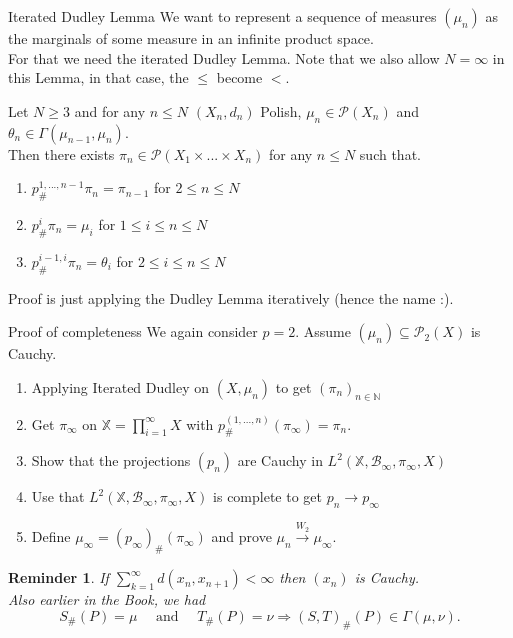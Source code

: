 \documentclass[10pt]{beamer}
\theoremstyle{reminder}
\newtheorem{reminder}{Reminder}
\begin{document}
\begin{frame}{Iterated Dudley Lemma}
    We want to represent a sequence of measures $(\mu_n)$ as the marginals of some measure in an infinite product space. \\ 
    \vspace{0.5cm}
    For that we need the iterated Dudley Lemma. Note that we also allow $N = \infty$ in this Lemma, in that case, the $\leq$ become $<$.
    \begin{lemma}
        Let $N \geq 3$ and for any $n \leq N$ $(X_n,d_n)$ Polish, $\mu_n \in \mathcal{P}(X_n)$ and $\theta_n \in \Gamma(\mu_{n-1},\mu_n)$. \\ 
        Then there exists $\pi_n \in \mathcal{P}(X_1\times ... \times X_n)$ for any $n \leq N$ such that.
        \begin{enumerate}
            \item $p^{1,...,n-1}_{\#} \pi_n = \pi_{n-1}$ for $2 \leq n \leq N$
            \item $p^i_{\#} \pi_n = \mu_i$ for $1 \leq i \leq n \leq N$
            \item $p^{i-1,i}_{\#} \pi_n = \theta_i$ for $2 \leq i\leq n \leq N$
        \end{enumerate}
    \end{lemma}
    Proof is just applying the Dudley Lemma iteratively (hence the name :).
\end{frame}

\begin{frame}{Proof of completeness}
    We again consider $p = 2$. Assume $(\mu_n) \subseteq \mathcal{P}_2(X)$ is Cauchy. 
    \begin{enumerate}
        \item Applying Iterated Dudley on $(X,\mu_n)$ to get $(\pi_n)_{n \in \mathbb{N}}$ 
        \item Get $\pi_\infty$ on $\mathbb{X} = \prod_{i = 1}^{\infty} X$ with $p^{(1,...,n)}_{\#}(\pi_\infty) = \pi_n.$
        \item Show that the projections $(p_n)$ are Cauchy in $L^2(\mathbb{X}, \mathcal{B}_\infty, \pi_\infty,X)$
        \item Use that $L^2(\mathbb{X}, \mathcal{B}_\infty, \pi_\infty,X)$ is complete to get $p_n \rightarrow p_\infty$
        \item Define $\mu_\infty = (p_\infty)_{\#}(\pi_\infty)$ and prove $\mu_n \xrightarrow{W_2} \mu_\infty.$
    \end{enumerate}
    \begin{reminder}
        If $\sum_{k = 1}^{\infty} d(x_n,x_{n+1}) < \infty$ then $(x_n)$ is Cauchy. \\
        \vspace{0.5cm}
        Also earlier in the Book, we had $$S_{\#}(P) = \mu \quad \text{ and } \quad T_{\#}(P) = \nu \Rightarrow (S,T)_{\#}(P) \in \Gamma(\mu,\nu).$$
    \end{reminder}
\end{frame}
\end{document}
